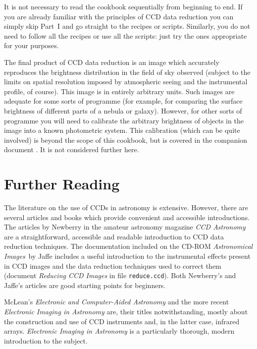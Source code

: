 \documentclass[twoside,11pt]{starlink}
\begin{document}
It is not necessary to read the cookbook sequentially from beginning
to end.  If you are already familiar with the principles of CCD data
reduction you can simply skip Part~I and go straight to the recipes or
scripts.  Similarly, you do not need to follow all the recipes or use all
the scripts: just try the ones appropriate for your purposes.

The final product of CCD data reduction is an image which accurately
reproduces the brightness distribution in the field of sky observed
(subject to the limits on spatial resolution imposed by atmospheric
seeing and the instrumental profile, of course).  This image is in entirely
arbitrary units.  Such images are adequate for some sorts of programme
(for example, for comparing the surface brightness of different parts of
a nebula or galaxy).  However, for other sorts of programme you will need
to calibrate the arbitrary brightness of objects in the image into a known
photometric system.  This calibration (which can be quite involved) is
beyond the scope of this cookbook, but is covered in the companion document
\/\cite{SC6}.
It is not considered further here.


\section{\label{FURTHER}Further Reading}

The literature on the use of CCDs in astronomy is extensive.  However,
there are several articles and books which provide convenient and accessible
introductions.  The articles by Newberry\cite{NEWBERRY95A, NEWBERRY95B,
NEWBERRY96} in the amateur astronomy magazine \textit{CCD Astronomy}\, are a
straightforward, accessible and readable introduction to CCD data reduction
techniques.  The documentation included on the CD-ROM \textit{Astronomical
Images}\, by Jaffe\cite{JAFFE98} includes a useful introduction to the
instrumental effects present in CCD images and the data reduction techniques
used to correct them (document \textit{Reducing CCD Images}\/ in file \texttt{reduce.ccd}).  Both Newberry's and Jaffe's articles are good starting
points for beginners.

McLean's \textit{Electronic and Computer-Aided Astronomy}\/\cite{MCLEAN89}
and the more recent \textit{Electronic Imaging in Astronomy}\/\cite{MCLEAN97}
are, their titles notwithstanding, mostly about the construction and use of
CCD instruments and, in the latter case, infrared arrays.  \textit{Electronic
Imaging in Astronomy}\/ is a particularly thorough, modern introduction to
the subject.
\end{document}
